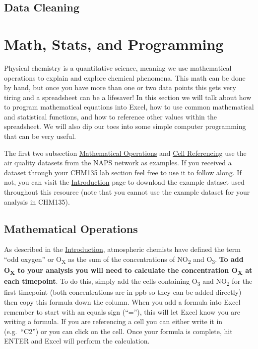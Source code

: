 \documentclass[
]{book}
\begin{document}
\hypertarget{data-cleaning}{%
\section{Data Cleaning}\label{data-cleaning}}

\hypertarget{math-stats-and-programming}{%
\chapter{Math, Stats, and Programming}\label{math-stats-and-programming}}

Physical chemistry is a quantitative science, meaning we use mathematical operations to explain and explore chemical phenomena. This math can be done by hand, but once you have more than one or two data points this gets very tiring and a spreadsheet can be a lifesaver! In this section we will talk about how to program mathematical equations into Excel, how to use common mathematical and statistical functions, and how to reference other values within the spreadsheet. We will also dip our toes into some simple computer programming that can be very useful.

The first two subsection \protect\hyperlink{mathematical-operations}{Mathematical Operations} and \protect\hyperlink{cell-referencing}{Cell Referencing} use the air quality datasets from the NAPS network as examples. If you received a dataset through your CHM135 lab section feel free to use it to follow along. If not, you can visit the \protect\hyperlink{intro}{Introduction} page to download the example dataset used throughout this resource (note that you cannot use the example dataset for your analysis in CHM135).

\hypertarget{mathematical-operations}{%
\section{Mathematical Operations}\label{mathematical-operations}}

As described in the \protect\hyperlink{intro}{Introduction}, atmospheric chemists have defined the term ``odd oxygen'' or O\textsubscript{X} as the sum of the concentrations of NO\textsubscript{2} and O\textsubscript{3}. \textbf{To add O\textsubscript{X} to your analysis you will need to calculate the concentration O\textsubscript{X} at each timepoint}. To do this, simply add the cells containing O\textsubscript{3} and NO\textsubscript{2} for the first timepoint (both concentrations are in ppb so they can be added directly) then copy this formula down the column. When you add a formula into Excel remember to start with an equals sign (``=''), this will let Excel know you are writing a formula. If you are referencing a cell you can either write it in (e.g.~``C2'') or you can click on the cell. Once your formula is complete, hit ENTER and Excel will perform the calculation.
\end{document}
